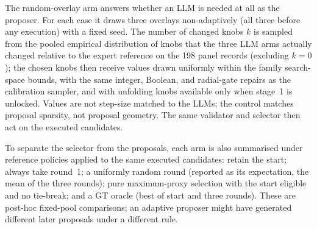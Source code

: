 \documentclass[a4paper,fleqn]{cas-dc}
\begin{document}
The random-overlay arm answers whether an LLM is needed at all as the proposer. For each case it draws three overlays non-adaptively (all three before any execution) with a fixed seed. The number of changed knobs $k$ is sampled from the pooled empirical distribution of knobs that the three LLM arms actually changed relative to the expert reference on the 198 panel records (excluding $k=0$); the chosen knobs then receive values drawn uniformly within the family search-space bounds, with the same integer, Boolean, and radial-gate repairs as the calibration sampler, and with unfolding knobs available only when stage~1 is unlocked. Values are not step-size matched to the LLMs; the control matches proposal sparsity, not proposal geometry. The same validator and selector then act on the executed candidates.

To separate the selector from the proposals, each arm is also summarised under reference policies applied to the same executed candidates: retain the start; always take round~1; a uniformly random round (reported as its expectation, the mean of the three rounds); pure maximum-proxy selection with the start eligible and no tie-break; and a GT oracle (best of start and three rounds). These are post-hoc fixed-pool comparisons; an adaptive proposer might have generated different later proposals under a different rule.
\end{document}
